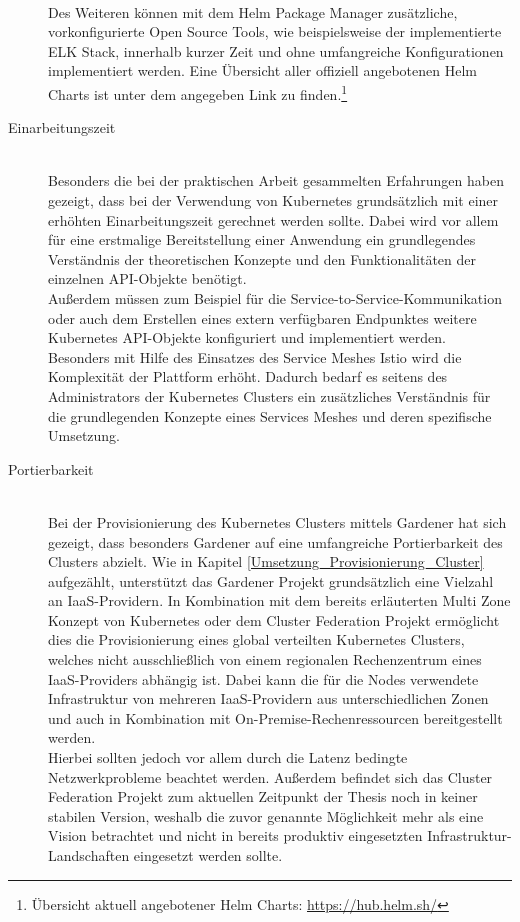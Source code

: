 \begin{description}
\\
Des Weiteren können mit dem Helm Package Manager zusätzliche, vorkonfigurierte Open Source Tools, wie beispielsweise der implementierte ELK Stack, innerhalb kurzer Zeit und ohne umfangreiche Konfigurationen implementiert werden. Eine Übersicht aller offiziell angebotenen Helm Charts ist unter dem angegeben Link zu finden.\footnote{Übersicht aktuell angebotener Helm Charts: \url{https://hub.helm.sh/}}\\
\item[Einarbeitungszeit] \hfill \\
Besonders die bei der praktischen Arbeit gesammelten Erfahrungen haben gezeigt, dass bei der Verwendung von Kubernetes grundsätzlich mit einer erhöhten Einarbeitungszeit gerechnet werden sollte. Dabei wird vor allem für eine erstmalige Bereitstellung einer Anwendung ein grundlegendes Verständnis der theoretischen Konzepte und den Funktionalitäten der einzelnen \ac{API}-Objekte benötigt.\\
\newpage
Außerdem müssen zum Beispiel für die Service-to-Service-Kommunikation oder auch dem Erstellen eines extern verfügbaren Endpunktes weitere Kubernetes \ac{API}-Objekte konfiguriert und implementiert werden.\\
Besonders mit Hilfe des Einsatzes des Service Meshes Istio wird die Komplexität der Plattform erhöht. Dadurch bedarf es seitens des Administrators der Kubernetes Clusters ein zusätzliches Verständnis für die grundlegenden Konzepte eines Services Meshes und deren spezifische Umsetzung.\\
\item[Portierbarkeit] \hfill \\
Bei der Provisionierung des Kubernetes Clusters mittels Gardener hat sich gezeigt, dass besonders Gardener auf eine umfangreiche Portierbarkeit des Clusters abzielt. Wie in Kapitel \ref{Umsetzung_Provisionierung_Cluster} aufgezählt, unterstützt das Gardener Projekt grundsätzlich eine Vielzahl an \ac{IaaS}-Providern. In Kombination mit dem bereits erläuterten Multi Zone Konzept von Kubernetes oder dem Cluster Federation Projekt ermöglicht dies die Provisionierung eines global verteilten Kubernetes Clusters, welches nicht ausschließlich von einem regionalen Rechenzentrum eines \ac{IaaS}-Providers abhängig ist. Dabei kann die für die Nodes verwendete Infrastruktur von mehreren \ac{IaaS}-Providern aus unterschiedlichen Zonen und auch in Kombination mit On-Premise-Rechenressourcen bereitgestellt werden.\\
Hierbei sollten jedoch vor allem durch die Latenz bedingte Netzwerkprobleme beachtet werden. Außerdem befindet sich das Cluster Federation Projekt zum aktuellen Zeitpunkt der Thesis noch in keiner stabilen Version, weshalb die zuvor genannte Möglichkeit mehr als eine Vision betrachtet und nicht in bereits produktiv eingesetzten Infrastruktur-Landschaften eingesetzt werden sollte.\\

\end{description}
